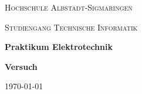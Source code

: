     \begin{titlepage}
        \centering
        {\scshape\LARGE Hochschule Albstadt-Sigmaringen \par}
        {\scshape\large Studiengang Technische Informatik \par}
        \vspace{3cm}
        {\LARGE\bfseries Praktikum Elektrotechnik\par}
        \vspace{2cm}
        {\Huge\bfseries Versuch \vnumber\par}
        \vspace{1cm}
        {\Large \vname\par}
        \vspace{2cm}
        \vfill

        {\large \today\par}
    \end{titlepage}